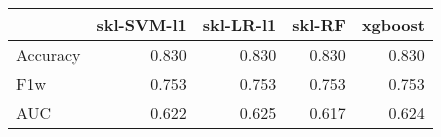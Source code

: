 \begin{tabular}{lrrrr}
\toprule
{} &  skl-SVM-l1 &  skl-LR-l1 &  skl-RF &  xgboost \\
\midrule
Accuracy &       0.830 &      0.830 &   0.830 &    0.830 \\
F1w      &       0.753 &      0.753 &   0.753 &    0.753 \\
AUC      &       0.622 &      0.625 &   0.617 &    0.624 \\
\bottomrule
\end{tabular}
